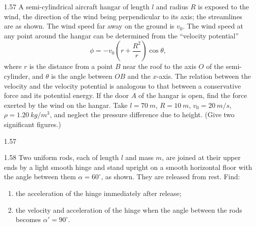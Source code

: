 \begin{problem}{1.57}
A semi-cylindrical aircraft hangar of length $l$ and radius $R$ is exposed to the wind, the direction of the wind being perpendicular to its axis; the streamlines are as shown. The wind speed far away on the ground is $v_0$. The wind speed at any point around the hangar can be determined from the ``velocity potential''
\[
\phi=-v_0\left(r+\dfrac{R^2}{r}\right)\cos\theta,
\]
where $r$ is the distance from a point $B$ near the roof to the axis $O$ of the semi-cylinder, and $\theta$ is the angle between $OB$ and the $x$-axis. The relation between the velocity and the velocity potential is analogous to that between a conservative force and its potential energy. If the door $A$ of the hangar is open, find the force exerted by the wind on the hangar. Take $l=\SI{70}{m}$, $R=\SI{10}{m}$, $v_0=\SI{20}{m/s}$, $\rho=\SI{1.20}{kg/m^3}$, and neglect the pressure difference due to height. (Give two significant figures.)
\end{problem}

\begin{figbox}{1.57}
\end{figbox}

\begin{problem}{1.58}
Two uniform rods, each of length $l$ and mass $m$, are joined at their upper ends by a light smooth hinge and stand upright on a smooth horizontal floor with the angle between them $\alpha=60^\circ$, as shown. They are released from rest. Find:
\begin{enumerate}[label=(\arabic*),leftmargin=2.2em,itemsep=1pt,topsep=2pt]
\item the acceleration of the hinge immediately after release;
\item the velocity and acceleration of the hinge when the angle between the rods becomes $\alpha'=90^\circ$.
\end{enumerate}
\end{problem}

